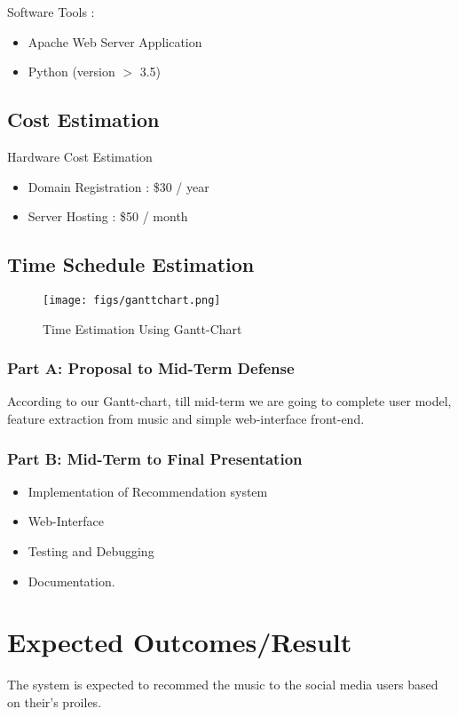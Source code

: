 \documentclass[a4paper,12pt]{article}
\begin{document}
Software Tools :
\begin{itemize}
\item Apache Web Server Application
\item Python (version $>$ 3.5)
\end{itemize}

\subsection{Cost Estimation}
Hardware Cost Estimation
\begin{itemize}
\item Domain Registration : \$30 / year
\item Server Hosting : \$50 / month
\end{itemize}

\subsection{Time Schedule Estimation}
\begin{figure}[ht!]
  \texttt{[image: figs/ganttchart.png]}
  \caption{Time Estimation Using Gantt-Chart \label{fig:ganttchart}}
\end{figure}

\subsubsection{Part A: Proposal to Mid-Term Defense}
According to our Gantt-chart, till mid-term we are going to complete user model, feature extraction from music and simple web-interface front-end.
\subsubsection{Part B: Mid-Term to Final Presentation}
\begin{itemize}
\item Implementation of Recommendation system
\item Web-Interface
\item Testing and Debugging 
\item Documentation.
\end{itemize}

\section{Expected Outcomes/Result}
The system is expected to recommed the music to the social media users based on their's proiles.
\end{document}

